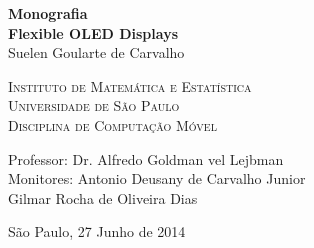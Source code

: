 \documentclass[11pt,oneside,a4paper]{book}
\begin{document}
\frontmatter 
\setcounter{tocdepth}{2}

\onehalfspacing  %

\thispagestyle{empty}
\begin{center}
    \vspace*{2.3cm}
    \textbf{\Large{Monografia}}\\ 

    \vspace*{2.3cm}
    \textbf{\Huge{Flexible OLED Displays}}\\
        
    \vspace*{2.2cm}
    \Large{Suelen Goularte de Carvalho}
    
    \vskip 3cm
    \textsc{
    Instituto de Matemática e Estatística\\[-0.25cm]
    Universidade de São Paulo\\[-0.25cm]
    Disciplina de Computação Móvel\\[-0.25cm]}
    
    \vskip 1.5cm
    Professor: Dr. Alfredo Goldman vel Lejbman\\
    Monitores: Antonio Deusany de Carvalho Junior\\
    		   Gilmar Rocha de Oliveira Dias\\
    
   	\vskip 3cm
        
    \vskip 0.5cm
    \normalsize{São Paulo, 27 Junho de 2014}
\end{center}

\end{document}
